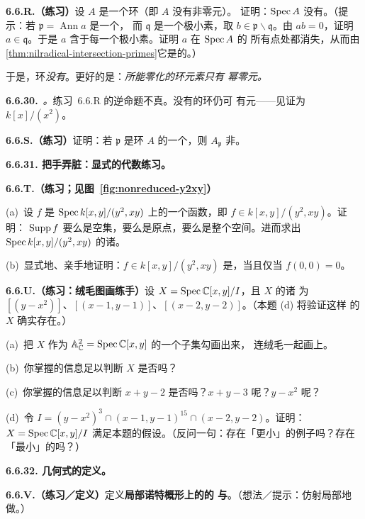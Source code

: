 \textbf{6.6.R.（练习）}\quad 设 $A$ 是一个\trReduced{}环（即 $A$ 没有非零\trNilpotent{}元）。
证明：$\operatorname{Spec} A$ 没有\trEmbeddedPrime{}。（提示：若 $\mathfrak{p}=\operatorname{Ann}a$ 是一个\trEmbeddedPrime{}，
而 $\mathfrak{q}$ 是一个极小素，取 $b\in\mathfrak{p}\smallsetminus\mathfrak{q}$。由
$ab=0$，证明 $a\in\mathfrak{q}$。于是 $a$ 含于每一个极小素。证明 $a$ 在 $\operatorname{Spec} A$ 的
所有点处都消失，从而由\cref{thm:nilradical-intersection-primes}它是\trNilpotent{}的。）

于是，\trReduced{}环\emph{没有\trEmbeddedPrime{}}。更好的是：\emph{\trEmbeddedPrime{}所能零化的环元素只有
幂零元。}

\textbf{6.6.30.}\ \emph{\trhRemark{}。}\quad 练习~6.6.R 的逆命题不真。没有\trEmbeddedPrime{}的环仍可
有\trNilpotent{}元——见证为 $k[x]/(x^2)$。

\textbf{6.6.S.（练习）}\quad 证明：若 $\mathfrak{p}$ 是环 $A$ 的一个\trEmbeddedPrime{}，则
$A_{\mathfrak{p}}$ 非\trReduced{}。

\textbf{6.6.31. 把手弄脏：显式的代数练习。}

\textbf{6.6.T.（练习；见图~\ref{fig:nonreduced-y2xy}）}

(a)~设 $f$ 是 $\operatorname{Spec} k[x,y]/(y^2,xy)$ 上的一个函数，即 $f\in k[x,y]/(y^2,xy)$。证明：
$\operatorname{Supp} f$ 要么是空集，要么是原点，要么是整个空间。进而求出
$\operatorname{Spec} k[x,y]/(y^2,xy)$ 的诸\trAssociatedPoint。

(b)~显式地、亲手地证明：$f\in k[x,y]/(y^2,xy)$ 是\trZerodivisor，当且仅当
$f(0,0)=0$。

\textbf{6.6.U.（练习：绒毛图画练手）}\quad 设 $X=\operatorname{Spec}\mathbb{C}[x,y]/I$，且 $X$ 的诸%
\trAssociatedPoint{}为 $[(y-x^2)]$、$[(x-1,y-1)]$、$[(x-2,y-2)]$。（本题 (d) 将验证这样
的 $X$ 确实存在。）

(a)~把 $X$ 作为 $\mathbb{A}^2_{\mathbb{C}}=\operatorname{Spec}\mathbb{C}[x,y]$ 的一个子集勾画出来，
连绒毛一起画上。

(b)~你掌握的信息足以判断 $X$ 是否\trReduced{}吗？

(c)~你掌握的信息足以判断 $x+y-2$ 是否\trZerodivisor{}吗？$x+y-3$ 呢？$y-x^2$ 呢？

(d)~令 $I=(y-x^2)^3\cap(x-1,y-1)^{15}\cap(x-2,y-2)$。证明：$X=\operatorname{Spec}\mathbb{C}[x,y]/I$
满足本题的假设。（反问一句：存在「更小」的例子吗？存在「最小」的吗？）

\textbf{6.6.32. 几何式的定义。}

\textbf{6.6.V.（练习／定义）}\quad 定义\textbf{局部诺特概形上的\trCoherentSheaf{}的%
\trAssociatedPoint{}与\trEmbeddedPoint}。（想法／提示：仿射局部地做。）

